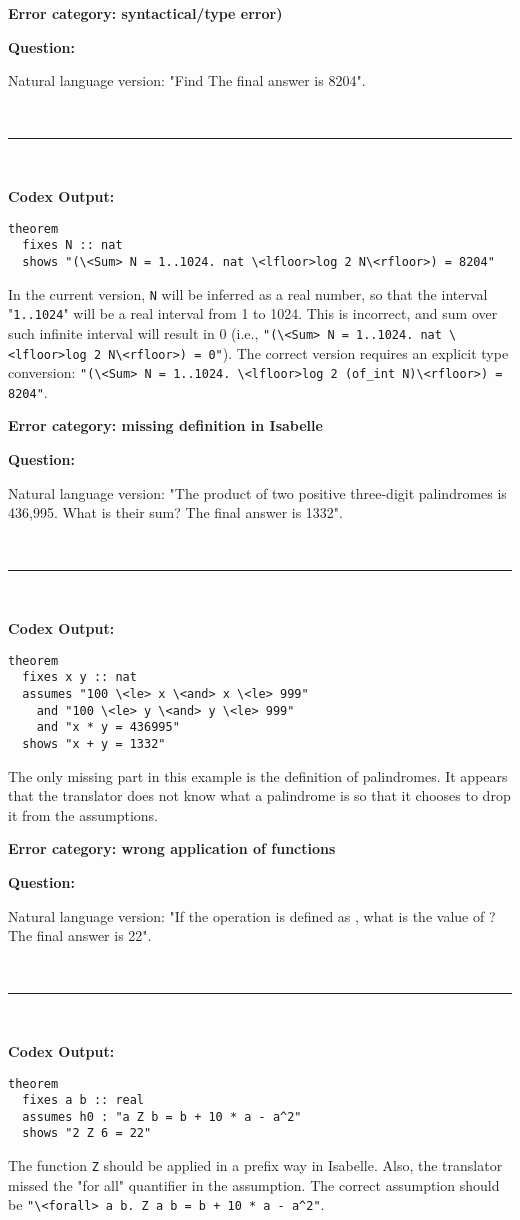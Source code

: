 \documentclass{article}
\begin{document}
\begin{boxB}
\textbf{Error category: syntactical/type error)}

\textbf{Question:}

Natural language version: "Find
 The final answer is 8204".

\
\hrule
\

\textbf{Codex Output:}
\begin{lstlisting}
theorem
  fixes N :: nat
  shows "(\<Sum> N = 1..1024. nat \<lfloor>log 2 N\<rfloor>) = 8204"
\end{lstlisting}
\end{boxB}
In the current version, \texttt{N} will be inferred as a real number, so that the interval "\texttt{1..1024}" will be a real interval from 1 to 1024. This is incorrect, and sum over such infinite interval will result in 0 (i.e., \lstinline|"(\<Sum> N = 1..1024. nat \<lfloor>log 2 N\<rfloor>) = 0"|). The correct version requires an explicit type conversion:
\lstinline|"(\<Sum> N = 1..1024. \<lfloor>log 2 (of_int N)\<rfloor>) = 8204"|.

\begin{boxB}
\textbf{Error category: missing definition in Isabelle}

\textbf{Question:}

Natural language version: "The product of two positive three-digit 
palindromes is 436,995. What is their sum? The final answer is 1332".

\
\hrule
\

\textbf{Codex Output:}
\begin{lstlisting}
theorem
  fixes x y :: nat
  assumes "100 \<le> x \<and> x \<le> 999"
    and "100 \<le> y \<and> y \<le> 999"
    and "x * y = 436995"
  shows "x + y = 1332"
\end{lstlisting}
\end{boxB}

The only missing part in this example is the definition of palindromes. It appears that the translator does not know what a palindrome is so that it chooses to drop it from the assumptions.

\begin{boxB}
\textbf{Error category: wrong application of functions}

\textbf{Question:}

Natural language version: "If the operation  is defined as , 
what is the value of ? The final answer is 22".

\
\hrule
\

\textbf{Codex Output:}
\begin{lstlisting}
theorem
  fixes a b :: real
  assumes h0 : "a Z b = b + 10 * a - a^2"
  shows "2 Z 6 = 22"
\end{lstlisting}
\end{boxB}
The function \lstinline|Z| should be applied in a prefix way in Isabelle. Also, the translator missed the "for all" quantifier in the assumption. The correct assumption should be \lstinline|"\<forall> a b. Z a b = b + 10 * a - a^2"|.
\end{document}
